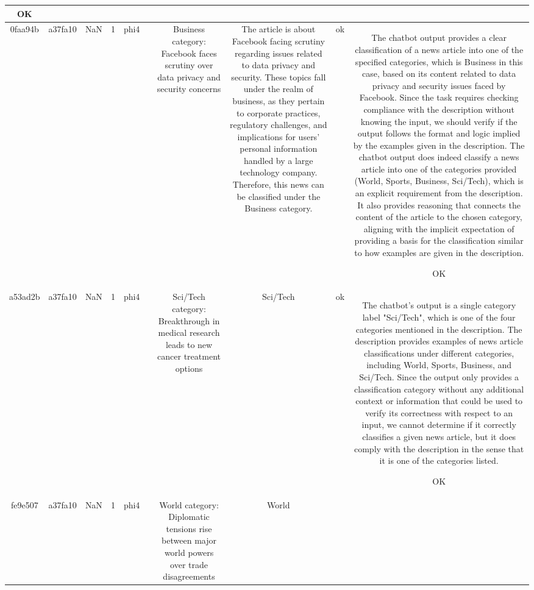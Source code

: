 \begin{table}[h!]
\begin{tabular}{|c|c|c|c|c|c|c|c|c|c|}
OK\\
\hline
0faa94b & a37fa10 & NaN & 1 & phi4 &  & Business category: Facebook faces scrutiny over data privacy and security concerns & The article is about Facebook facing scrutiny regarding issues related to data privacy and security. These topics fall under the realm of business, as they pertain to corporate practices, regulatory challenges, and implications for users' personal information handled by a large technology company. Therefore, this news can be classified under the Business category. & ok & The chatbot output provides a clear classification of a news article into one of the specified categories, which is Business in this case, based on its content related to data privacy and security issues faced by Facebook. Since the task requires checking compliance with the description without knowing the input, we should verify if the output follows the format and logic implied by the examples given in the description. The chatbot output does indeed classify a news article into one of the categories provided (World, Sports, Business, Sci/Tech), which is an explicit requirement from the description. It also provides reasoning that connects the content of the article to the chosen category, aligning with the implicit expectation of providing a basis for the classification similar to how examples are given in the description.

OK\\
\hline
a53ad2b & a37fa10 & NaN & 1 & phi4 &  & Sci/Tech category: Breakthrough in medical research leads to new cancer treatment options & Sci/Tech & ok & The chatbot's output is a single category label "Sci/Tech", which is one of the four categories mentioned in the description. The description provides examples of news article classifications under different categories, including World, Sports, Business, and Sci/Tech. Since the output only provides a classification category without any additional context or information that could be used to verify its correctness with respect to an input, we cannot determine if it correctly classifies a given news article, but it does comply with the description in the sense that it is one of the categories listed.

OK\\
\hline
fe9e507 & a37fa10 & NaN & 1 & phi4 &  & World category: Diplomatic tensions rise between major world powers over trade disagreements & World


\end{tabular}
\end{table}
